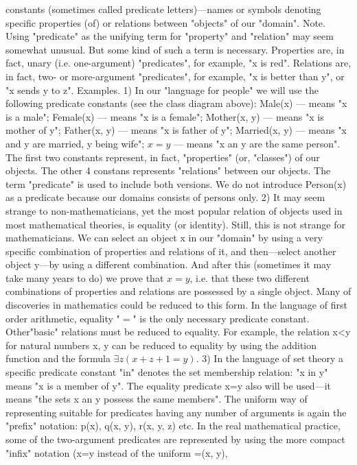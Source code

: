 constants (sometimes called predicate letters)---names or symbols denoting specific properties (of) or
relations between "objects" of our "domain".
Note. Using "predicate" as the unifying term for "property" and "relation" may seem somewhat unusual.
But some kind of such a term is necessary. Properties are, in fact, unary (i.e. one-argument) "predicates",
for example, "x is red". Relations are, in fact, two- or more-argument "predicates", for example, "x is
better than y", or "x sends y to z".
Examples. 1) In our "language for people" we will use the following predicate constants (see the class diagram above):
Male(x) --- means "x is a male";
Female(x) --- means "x is a female";
Mother(x, y) --- means "x is mother of y";
Father(x, y) --- means "x is father of y";
Married(x, y) --- means "x and y are married, y being wife";
\(x=y\) --- means "x an y are the same person".
The first two constants represent, in fact, "properties" (or, "classes") of our objects. The other 4 constans represents "relations"
between our objects. The term "predicate" is used to include both versions. We do not introduce Person(x) as a predicate
because our domains consists of persons only.
2) It may seem strange to non-mathematicians, yet the most popular relation of objects used in most mathematical theories, is
equality (or identity). Still, this is not strange for mathematicians. We can select an object x in our "domain" by using a very
specific combination of properties and relations of it, and then---select another object y---by using a different combination.
And after this (sometimes it may take many years to do) we prove that \(x=y\), i.e. that these two different combinations of
properties and relations are possessed by a single object. Many of discoveries in mathematics could be reduced to this form.
In the language of first order arithmetic, equality "\(=\)" is the only necessary predicate constant. Other"basic" relations must be
reduced to equality. For example, the relation x<y for natural numbers x, y can be reduced to equality by using the addition
function and the formula \(\exists z(x+z+1=y)\).
3) In the language of set theory a specific predicate constant "in" denotes the set membership relation: "x in y" means "x is a
member of y". The equality predicate x=y also will be used---it means "the sets x an y possess the same members".
The uniform way of representing suitable for predicates having any number of arguments is again the
"prefix" notation: p(x), q(x, y), r(x, y, z) etc. In the real mathematical practice, some of the two-argument
predicates are represented by using the more compact "infix" notation (x=y instead of the uniform =(x, y),
